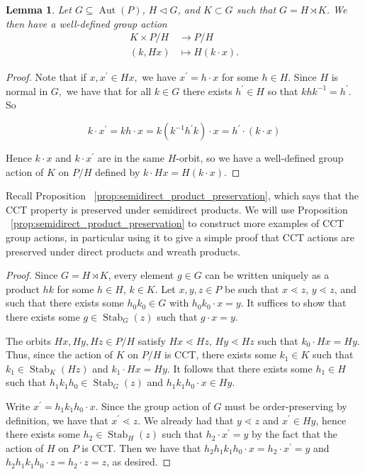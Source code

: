 \documentclass[smallextended, envcountsame, numbook]{svjour3}
\theoremstyle{plain}
\newtheorem{lem}[thm]{Lemma}
\theoremstyle{definition}
\theoremstyle{remark}
\numberwithin{equation}{section}
\newcommand\Stab{\operatorname{Stab}}
\newcommand\Aut{\operatorname{Aut}}
\begin{document}
\begin{lem}
Let $G\subseteq\Aut(P)$, $H\triangleleft G$, and $K\subset G$ such that $G = H\rtimes K$. We then have a well-defined group action 
\begin{align*}
K \times P/H &\rightarrow P/H \\
(k,Hx) &\mapsto H(k \cdot x).
\end{align*}

\end{lem}
\begin{proof}

Note that if $x,x^\prime\in Hx,$ we have $x^\prime = h\cdot x$ for some $h\in H$. Since $H$ is normal in $G,$ we have that for all $k \in G$ there exists $h^\prime \in H$ so that $khk^{-1} = h^\prime$. So 

$$k\cdot x^\prime = kh\cdot x = k(k^{-1}h^\prime k)\cdot x = h^\prime\cdot (k\cdot x)$$

Hence $k\cdot x$ and $k\cdot x^\prime$ are in the same $H$-orbit, so we have a well-defined group action of $K$ on $P/H$ defined by $k\cdot Hx = H(k\cdot x)$.
\end{proof}

Recall Proposition ~\ref{prop:semidirect_product_preservation}, which says that the CCT property is preserved under semidirect products.  We will use Proposition ~\ref{prop:semidirect_product_preservation} to construct more examples of CCT group actions, in particular using it to give a simple proof that CCT actions are preserved under direct products and wreath products.

\semidirect*
\begin{proof}
Since $G = H\rtimes K$, every element $g\in G$ can be written uniquely as a product $hk$ for some $h\in H$, $k\in K$.  Let $x,y,z\in P$ be such that $x\lessdot z$, $y\lessdot z$, and such that there exists some $h_0k_0\in G$ with $h_0k_0\cdot x = y$.  It suffices to show that there exists some $g\in \Stab_G(z)$ such that $g\cdot x = y$.

The orbits $Hx, Hy, Hz\in P/H$ satisfy $Hx\lessdot Hz$, $Hy\lessdot Hz$ such that $k_0\cdot Hx = Hy$. Thus, since the action of $K$ on $P/H$ is CCT, there exists some $k_1\in K$ such that $k_1\in \Stab_K(Hz)$ and $k_1\cdot Hx = Hy$.  It follows that there exists some $h_1\in H$ such that $h_1k_1h_0\in \Stab_G(z)$ and $h_1k_1h_0\cdot x\in Hy$.

Write $x^\prime = h_1k_1h_0\cdot x$.  Since the group action of $G$ must be order-preserving by definition, we have that $x^\prime \lessdot z$.  We already had that $y\lessdot z$ and $x^\prime\in Hy$, hence there exists some $h_2\in \Stab_H(z)$ such that $h_2\cdot x^\prime = y$ by the fact that the action of $H$ on $P$ is CCT.  Then we have that $h_2h_1k_1h_0\cdot x = h_2\cdot x^\prime = y$ and $h_2h_1k_1h_0\cdot z = h_2\cdot z = z$, as desired.
\end{proof}
\end{document}
